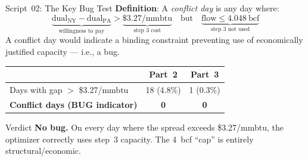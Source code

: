 \documentclass[aspectratio=169, 11pt]{beamer}
\begin{document}
\begin{frame}{Script~02: The Key Bug Test}
  \textbf{Definition}: A \emph{conflict day} is any day where:
  \[
    \underbrace{\text{dual}_\text{NY} - \text{dual}_\text{PA}}_{\text{willingness to pay}} > \underbrace{\$3.27/\text{mmbtu}}_{\text{step~3 cost}}
    \quad \text{but} \quad
    \underbrace{\text{flow} \leq 4.048~\text{bcf}}_{\text{step~3 not used}}
  \]
  A conflict day would indicate a binding constraint preventing use of economically justified capacity --- i.e., a bug.

  \vspace{0.5em}
  \begin{table}
    \centering
    \begin{tabular}{lcc}
      \toprule
      & \textbf{Part~2} & \textbf{Part~3} \\
      \midrule
      Days with gap $>$ \$3.27/mmbtu    & 18 (4.8\%)  & 1 (0.3\%) \\
      \textbf{Conflict days (BUG indicator)}  & \textcolor{okgreen}{\textbf{0}}     & \textcolor{okgreen}{\textbf{0}} \\
      \bottomrule
    \end{tabular}
  \end{table}

  \vspace{0.5em}
  \begin{block}{Verdict}
    \textbf{No bug.} On every day where the spread exceeds \$3.27/mmbtu, the optimizer correctly uses step~3 capacity. The 4~bcf ``cap'' is entirely structural/economic.
  \end{block}
\end{frame}
\end{document}

